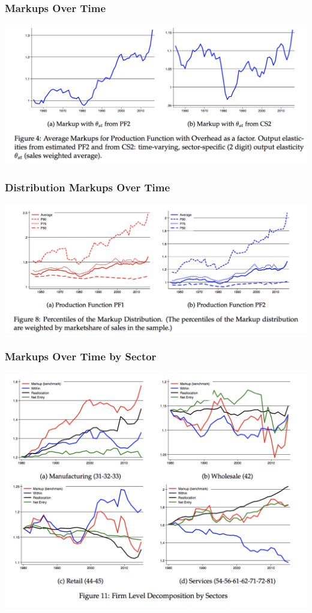 \documentclass[11pt, aspectratio=169]{beamer}
\begin{document}
\begin{frame}[c]\frametitle{Markups Over Time}
    \centering
    \includegraphics[scale=.7]{DLE4.png}

\end{frame}

\begin{frame}[c]\frametitle{Distribution Markups Over Time}
    \centering
    \includegraphics[scale=.7]{DLE8.png}

\end{frame}

\begin{frame}[c]\frametitle{Markups Over Time by Sector}
    \centering
    \includegraphics[scale=.5]{DLE11.png}

\end{frame}
\end{document}
